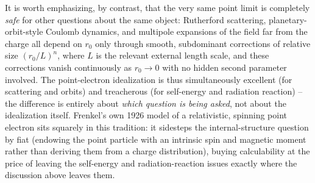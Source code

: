 It is worth emphasizing, by contrast, that the very same point
limit is completely \emph{safe} for other questions about the
same object: Rutherford scattering, planetary-orbit-style
Coulomb dynamics, and multipole expansions of the field far from
the charge all depend on $r_0$ only through smooth, subdominant
corrections of relative size $(r_0/L)^n$, where $L$ is the
relevant external length scale, and these corrections vanish
continuously as $r_0\to0$ with no hidden second parameter
involved. The point-electron idealization is thus simultaneously
excellent (for scattering and orbits) and treacherous (for
self-energy and radiation reaction) -- the difference is
entirely about \emph{which question is being asked}, not about
the idealization itself. Frenkel's own 1926 model of a
relativistic, spinning point electron sits squarely in this
tradition: it sidesteps the internal-structure question by fiat
(endowing the point particle with an intrinsic spin and magnetic
moment rather than deriving them from a charge distribution),
buying calculability at the price of leaving the self-energy and
radiation-reaction issues exactly where the discussion above
leaves them.

